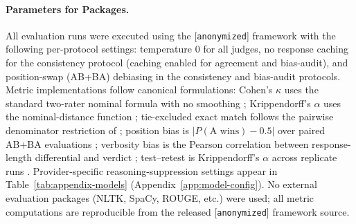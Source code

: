 \paragraph{Parameters for Packages.}
All evaluation runs were executed using the [\texttt{anonymized}]
framework with the following per-protocol settings: temperature $0$
for all judges, no response caching for the consistency protocol
(caching enabled for agreement and bias-audit), and position-swap
(AB+BA) debiasing in the consistency and bias-audit protocols. Metric
implementations follow canonical formulations: Cohen's $\kappa$ uses
the standard two-rater nominal formula with no smoothing
\citep{cohen1960coefficient}; Krippendorff's $\alpha$ uses the
nominal-distance function \citep{hayes2007standard,krippendorff2011computing};
tie-excluded exact match follows the pairwise denominator restriction
of \citet{zheng2023judging}; position bias is
$\lvert P(\text{A wins}) - 0.5 \rvert$ over paired AB+BA evaluations
\citep{wang2023large}; verbosity bias is the Pearson correlation
between response-length differential and verdict
\citep{dubois2024alpacaeval}; test--retest is Krippendorff's $\alpha$
across replicate runs \citep{stureborg2024large}. Provider-specific
reasoning-suppression settings appear in
Table~\ref{tab:appendix-models} (Appendix~\ref{app:model-config}). No
external evaluation packages (NLTK, SpaCy, ROUGE, etc.) were used;
all metric computations are reproducible from the released
[\texttt{anonymized}] framework source.

